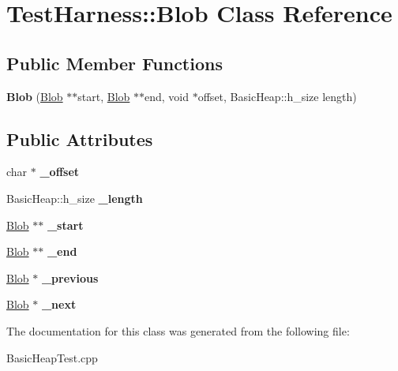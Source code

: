 \hypertarget{class_test_harness_1_1_blob}{}\section{Test\+Harness\+:\+:Blob Class Reference}
\label{class_test_harness_1_1_blob}
\subsection*{Public Member Functions}
\begin{DoxyCompactItemize}
\item 
\mbox{\label{class_test_harness_1_1_blob_aa995eab940e164b12b1b286cdb110be8}} 
{\bfseries Blob} (\hyperlink{class_test_harness_1_1_blob}{Blob} $\ast$$\ast$start, \hyperlink{class_test_harness_1_1_blob}{Blob} $\ast$$\ast$end, void $\ast$offset, Basic\+Heap\+::h\+\_\+size length)
\end{DoxyCompactItemize}
\subsection*{Public Attributes}
\begin{DoxyCompactItemize}
\item 
\mbox{\label{class_test_harness_1_1_blob_ac173605060f623f8b2be99e393c89096}} 
char $\ast$ {\bfseries \+\_\+offset}
\item 
\mbox{\label{class_test_harness_1_1_blob_aa78c6c072eeaaa76d7445b3dce0cf4c8}} 
Basic\+Heap\+::h\+\_\+size {\bfseries \+\_\+length}
\item 
\mbox{\label{class_test_harness_1_1_blob_a13c66a59433a68cbc918987d8cc71e84}} 
\hyperlink{class_test_harness_1_1_blob}{Blob} $\ast$$\ast$ {\bfseries \+\_\+start}
\item 
\mbox{\label{class_test_harness_1_1_blob_a99c2c5cdaf01a9ff1d9cd4ebd7888bf9}} 
\hyperlink{class_test_harness_1_1_blob}{Blob} $\ast$$\ast$ {\bfseries \+\_\+end}
\item 
\mbox{\label{class_test_harness_1_1_blob_ae4967f6930a3e41d4005a3a6ae773422}} 
\hyperlink{class_test_harness_1_1_blob}{Blob} $\ast$ {\bfseries \+\_\+previous}
\item 
\mbox{\label{class_test_harness_1_1_blob_af82404f21319b94642b066e906993f15}} 
\hyperlink{class_test_harness_1_1_blob}{Blob} $\ast$ {\bfseries \+\_\+next}
\end{DoxyCompactItemize}


The documentation for this class was generated from the following file\+:\begin{DoxyCompactItemize}
\item 
Basic\+Heap\+Test.\+cpp\end{DoxyCompactItemize}
